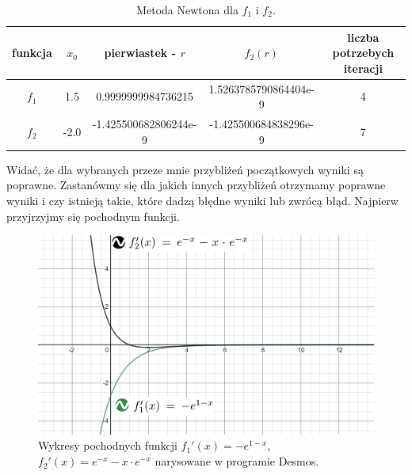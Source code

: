 \documentclass[]{article}
\begin{document}
	\begin{table}[!h]
	\centering
	\label{tab:table1}
		\begin{tabular}{|c|c|c|c|c|}
			\hline
			funkcja & $x_0$ & pierwiastek - $r$ & $f_2(r)$ & liczba potrzebych iteracji\\
			\hline
			$f_1$ & 1.5 & 0.9999999984736215 & 1.5263785790864404e-9 & 4 \\ \hline
			$f_2$ &-2.0 & -1.425500682806244e-9 & -1.425500684838296e-9 & 7 \\ \hline
		\end{tabular}
		\caption*{Metoda Newtona dla $f_1$ i $f_2$.}
	\end{table}

	Widać, że dla wybranych przeze mnie przybliżeń początkowych wyniki są poprawne.
	Zastanówmy się dla jakich innych przybliżeń otrzymamy poprawne wyniki i czy istnieją takie, które dadzą błędne wyniki lub zwrócą błąd. Najpierw przyjrzyjmy się pochodnym funkcji.
	\begin{figure}[!htbp]
		\includegraphics[height=0.39\textheight]{task6derivatives}
		\centering
		\caption{Wykresy pochodnych funkcji $f_1'(x) = -e^{1-x}$, 
			$f_2'(x) = e^{-x} - x\cdot e^{-x}$ narysowane w programie Desmos.}
	\end{figure}
\end{document}
